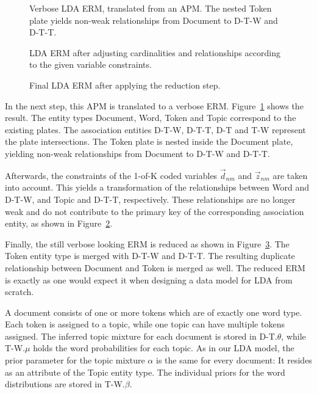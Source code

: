 \begin{figure}[p]
\centering
\scalebox{0.5}{\adjustTikzSize }
\caption[Verbose LDA ERM, translated from an APM]{Verbose LDA ERM, translated from an APM. The nested Token plate yields non-weak relationships from Document to D-T-W and D-T-T.}\label{fig:topic_erm_good_verbose}
\end{figure}

\begin{figure}[p]
\centering
\scalebox{0.5}{\adjustTikzSize }
\caption[LDA ERM after taking constraints into account]{LDA ERM after adjusting cardinalities and relationships according to the given variable constraints.}\label{fig:topic_erm_good_constraints}
\end{figure}

\begin{figure}[p]
\centering
\scalebox{0.5}{\adjustTikzSize }
\caption[Final LDA ERM after applying the reduction step]{Final LDA ERM after applying the reduction step.}\label{fig:topic_erm_good_reduced}
\end{figure}

In the next step, this APM is translated to a verbose ERM. Figure~\ref{fig:topic_erm_good_verbose} shows the result. The entity types Document, Word, Token and Topic correspond to the existing plates. The association entities D-T-W, D-T-T, D-T and T-W represent the plate intersections. The Token plate is nested inside the Document plate, yielding non-weak relationships from Document to D-T-W and D-T-T.

Afterwards, the constraints of the 1-of-K coded variables $\vec d_{nm}$ and $\vec z_{nm}$ are taken into account. This yields a transformation of the relationships between Word and D-T-W, and Topic and D-T-T, respectively. These relationships are no longer weak and do not contribute to the primary key of the corresponding association entity, as shown in Figure~\ref{fig:topic_erm_good_constraints}.

Finally, the still verbose looking ERM is reduced as shown in Figure~\ref{fig:topic_erm_good_reduced}. The Token entity type is merged with D-T-W and D-T-T. The resulting duplicate relationship between Document and Token is merged as well. The reduced ERM is exactly as one would expect it when designing a data model for LDA from scratch.

A document consists of one or more tokens which are of exactly one word type. Each token is assigned to a topic, while one topic can have multiple tokens assigned. The inferred topic mixture for each document is stored in D-T.$\theta$, while T-W.$\mu$ holds the word probabilities for each topic. As in our LDA model, the prior parameter for the topic mixture $\alpha$ is the same for every document: It resides as an attribute of the Topic entity type. The individual priors for the word distributions are stored in T-W.$\beta$.

